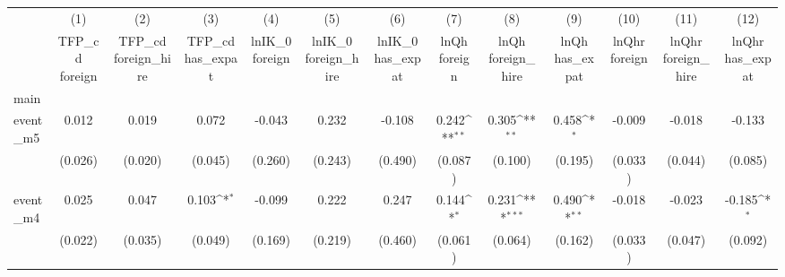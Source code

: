 {
\def\sym#1{\ifmmode^{#1}\else\(^{#1}\)\fi}
\begin{tabular}{l*{12}{c}}
\hline\hline
            &\multicolumn{1}{c}{(1)}&\multicolumn{1}{c}{(2)}&\multicolumn{1}{c}{(3)}&\multicolumn{1}{c}{(4)}&\multicolumn{1}{c}{(5)}&\multicolumn{1}{c}{(6)}&\multicolumn{1}{c}{(7)}&\multicolumn{1}{c}{(8)}&\multicolumn{1}{c}{(9)}&\multicolumn{1}{c}{(10)}&\multicolumn{1}{c}{(11)}&\multicolumn{1}{c}{(12)}\\
            &\multicolumn{1}{c}{TFP\_cd  foreign}&\multicolumn{1}{c}{TFP\_cd  foreign\_hire}&\multicolumn{1}{c}{TFP\_cd  has\_expat}&\multicolumn{1}{c}{lnIK\_0  foreign}&\multicolumn{1}{c}{lnIK\_0  foreign\_hire}&\multicolumn{1}{c}{lnIK\_0  has\_expat}&\multicolumn{1}{c}{lnQh  foreign}&\multicolumn{1}{c}{lnQh  foreign\_hire}&\multicolumn{1}{c}{lnQh  has\_expat}&\multicolumn{1}{c}{lnQhr  foreign}&\multicolumn{1}{c}{lnQhr  foreign\_hire}&\multicolumn{1}{c}{lnQhr  has\_expat}\\
\hline
main        &                     &                     &                     &                     &                     &                     &                     &                     &                     &                     &                     &                     \\
event\_m5    &       0.012         &       0.019         &       0.072         &      -0.043         &       0.232         &      -0.108         &       0.242\sym{**} &       0.305\sym{**} &       0.458\sym{*}  &      -0.009         &      -0.018         &      -0.133         \\
            &     (0.026)         &     (0.020)         &     (0.045)         &     (0.260)         &     (0.243)         &     (0.490)         &     (0.087)         &     (0.100)         &     (0.195)         &     (0.033)         &     (0.044)         &     (0.085)         \\
[1em]
event\_m4    &       0.025         &       0.047         &       0.103\sym{*}  &      -0.099         &       0.222         &       0.247         &       0.144\sym{*}  &       0.231\sym{***}&       0.490\sym{**} &      -0.018         &      -0.023         &      -0.185\sym{*}  \\
            &     (0.022)         &     (0.035)         &     (0.049)         &     (0.169)         &     (0.219)         &     (0.460)         &     (0.061)         &     (0.064)         &     (0.162)         &     (0.033)         &     (0.047)         &     (0.092)         \\

\end{tabular}}
